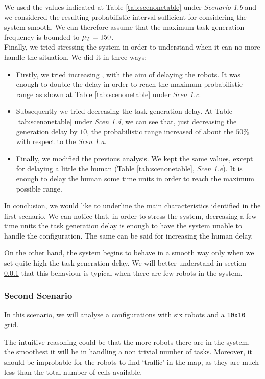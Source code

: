 We used the values indicated at Table \ref{tab:scenonetable} under \emph{Scenario 1.b} and we considered the resulting probabilistic interval sufficient for considering the system smooth. We can therefore assume that the maximum task generation frequency is bounded to $\mu_T = 150$.
\\

Finally, we tried stressing the system in order to understand when it can no more handle the situation. We did it in three ways:
\begin{itemize}
    \item Firstly, we tried increasing \K, with the aim of delaying the robots. It was enough to double the delay in order to reach the maximum probabilistic range as shown at Table \ref{tab:scenonetable} under \emph{Scen 1.c}.
    \item Subsequently we tried decreasing the task generation delay. At Table \ref{tab:scenonetable} under \emph{Scen 1.d}, we can see that, just decreasing the generation delay by $10$, the probabilistic range increased of about the $50\%$ with respect to the \emph{Scen 1.a}.
    \item Finally, we modified the previous analysis. We kept the same values, except for delaying a little the human (Table \ref{tab:scenonetable}, \emph{Scen 1.e}). It is enough to delay the human some time units in order to reach the maximum possible range.
\end{itemize}

In conclusion, we would like to underline the main characteristics identified in the first scenario. We can notice that, in order to stress the system, decreasing a few time units the task generation delay is enough to have the system unable to handle the configuration. The same can be said for increasing the human delay.

On the other hand, the system begins to behave in a smooth way only when we set quite high the task generation delay. We will better understand in section \ref{secondscenario} that this behaviour is typical when there are few robots in the system.

\subsubsection{Second Scenario} \label{secondscenario}
In this scenario, we will analyse a configurations with six robots and a \texttt{10x10} grid.

The intuitive reasoning could be that the more robots there are in the system, the smoothest it will be in handling a non trivial number of tasks. Moreover, it should be improbable for the robots to find `traffic' in the map, as they are much less than the total number of cells available.

